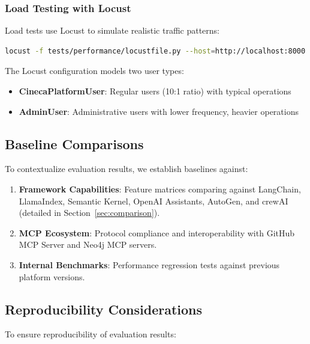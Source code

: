 \subsubsection{Load Testing with Locust}

Load tests use Locust to simulate realistic traffic patterns:

\begin{lstlisting}[language=bash,caption={Running Locust load tests.}]
locust -f tests/performance/locustfile.py --host=http://localhost:8000
\end{lstlisting}

The Locust configuration models two user types:
\begin{itemize}
    \item \textbf{CinecaPlatformUser}: Regular users (10:1 ratio) with typical operations
    \item \textbf{AdminUser}: Administrative users with lower frequency, heavier operations
\end{itemize}

\subsection{Baseline Comparisons}

To contextualize evaluation results, we establish baselines against:

\begin{enumerate}
    \item \textbf{Framework Capabilities}: Feature matrices comparing against LangChain, LlamaIndex, Semantic Kernel, OpenAI Assistants, AutoGen, and crewAI (detailed in Section~\ref{sec:comparison}).
    
    \item \textbf{MCP Ecosystem}: Protocol compliance and interoperability with GitHub MCP Server and Neo4j MCP servers.
    
    \item \textbf{Internal Benchmarks}: Performance regression tests against previous platform versions.
\end{enumerate}

\subsection{Reproducibility Considerations}

To ensure reproducibility of evaluation results:

